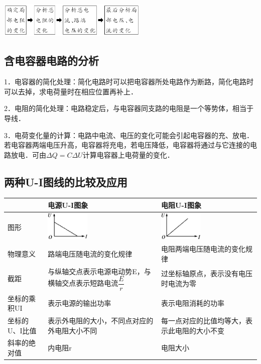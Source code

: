 \begin{center}\includegraphics[width=2.81111in,height=0.67014in]{media/image323.png}\end{center}

\newpage
\subsection{含电容器电路的分析}

1．电容器的简化处理：简化电路时可以把电容器所处电路作为断路，简化电路时可以去掉，求电荷量时在相应位置再补上．

2．电阻的简化处理：电路稳定后，与电容器同支路的电阻是一个等势体，相当于导线．

3．电荷变化量的计算：电路中电流、电压的变化可能会引起电容器的充、放电．若电容器两端电压升高，电容器将充电，若电压降低，电容器将通过与它连接的电路放电．可由$\Delta Q=C \Delta U$计算电容器上电荷量的变化．

\subsection{两种U-I图线的比较及应用}

\begin{longtable}[]{@{}m{2.5cm}m{5cm}m{5cm}@{}}
\toprule
& 电源U-I图象 & 电阻U-I图象\tabularnewline
\midrule
\endhead
图形 &
\includegraphics[width=0.82083in,height=0.5375in]{media/image325.png} &
\includegraphics[width=0.81111in,height=0.5375in]{media/image326.png}\tabularnewline
物理意义 & 路端电压随电流的变化规律 &
电阻两端电压随电流的变化规律\tabularnewline
截距 & 与纵轴交点表示电源电动势E，与横轴交点表示短路电流$\dfrac{E}{r}$ &
过坐标轴原点，表示没有电压时电流为零\tabularnewline
坐标的乘积UI & 表示电源的输出功率 & 表示电阻消耗的功率\tabularnewline
坐标的U、I比值 & 表示外电阻的大小，不同点对应的外电阻大小不同 &
每一点对应的比值均等大，表示此电阻的大小不变\tabularnewline
斜率的绝对值 & 内电阻r & 电阻大小\tabularnewline
\bottomrule
\end{longtable}



